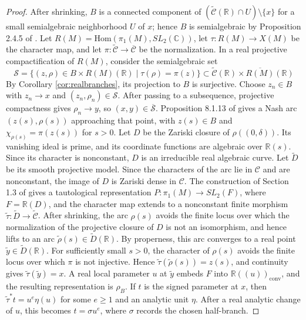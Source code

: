 \documentclass{article}
\theoremstyle{plain}
\theoremstyle{definition}
\theoremstyle{plain}
\theoremstyle{plain}
\theoremstyle{plain}
\theoremstyle{remark}
\theoremstyle{remark}
\theoremstyle{plain}
\theoremstyle{plain}
\theoremstyle{plain}
\theoremstyle{plain}
\begin{document}
\begin{proof}
After shrinking, $B$ is a connected component of $(\widetilde{\mathcal C}(\mathbb R) \cap U) \setminus \{x\}$ for a small semialgebraic neighborhood $U$ of $x$; hence $B$ is semialgebraic by Proposition 2.4.5 of \cite{bochnak-coste-roy}. Let $R(M) = \mathrm{Hom}(\pi_1(M), SL_2(\mathbb C))$, let $\tau: R(M) \to X(M)$ be the character map, and let $\pi: \widetilde{\mathcal C} \to \overline{\mathcal C}$ be the normalization. In a real projective compactification of $R(M)$, consider the semialgebraic set 
\begin{equation*}
	\mathcal S = \{(z, \rho) \in B \times R(M)(\mathbb R) \mid \tau(\rho) = \pi(z)\} \subset \widetilde{\mathcal C}(\mathbb R) \times \overline{R(M)}(\mathbb R)
\end{equation*}
By Corollary \ref{cor:realbranches}, its projection to $B$ is surjective. Choose $z_n \in B$ with $z_n \to x$ and $(z_n, \rho_n) \in \mathcal S$. After passing to a subsequence, projective compactness gives $\rho_n \to y$, so $(x, y) \in \overline{\mathcal S}$. Proposition 8.1.13 of \cite{bochnak-coste-roy} gives a Nash arc $(z(s), \rho(s))$ approaching that point, with $z(s) \in B$ and $\chi_{\rho(s)} = \pi(z(s))$ for $s > 0$. Let $D$ be the Zariski closure of $\rho((0, \delta))$. Its vanishing ideal is prime, and its coordinate functions are algebraic over $\mathbb R(s)$. Since its character is nonconstant, $D$ is an irreducible real algebraic curve. Let $\widetilde D$ be its smooth projective model. Since the characters of the arc lie in $\mathcal C$ and are nonconstant, the image of $D$ is Zariski dense in $\mathcal C$. The construction of Section 1.3 of \cite{cullershalen} gives a tautological representation $P: \pi_1(M) \to SL_2(F)$, where $F = \mathbb R(D)$, and the character map extends to a nonconstant finite morphism $\widetilde\tau: \widetilde D \to \widetilde{\mathcal C}$. After shrinking, the arc $\rho(s)$ avoids the finite locus over which the normalization of the projective closure of $D$ is not an isomorphism, and hence lifts to an arc $\widetilde\rho(s) \in \widetilde D(\mathbb R)$. By properness, this arc converges to a real point $\widetilde y \in \widetilde D(\mathbb R)$. For sufficiently small $s>0$, the character of $\rho(s)$ avoids the finite locus over which $\pi$ is not injective. Hence $\widetilde\tau(\widetilde\rho(s))=z(s)$, and continuity gives $\widetilde\tau(\widetilde y)=x$. A real local parameter $u$ at $\widetilde y$ embeds $F$ into $\mathbb R((u))_{\mathrm{conv}}$, and the resulting representation is $\rho_B$. If $t$ is the signed parameter at $x$, then $\widetilde\tau^*t = u^e\eta(u)$ for some $e \geq 1$ and an analytic unit $\eta$. After a real analytic change of $u$, this becomes $t = \sigma u^e$, where $\sigma$ records the chosen half-branch. 


\end{proof}
\end{document}
